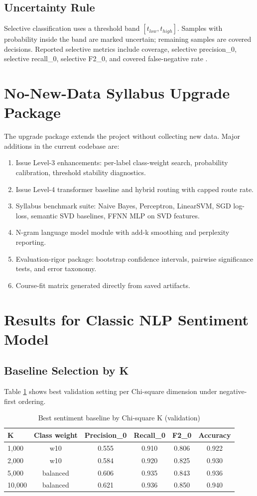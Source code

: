 \documentclass[12pt,a4paper]{article}
\begin{document}
\subsection{Uncertainty Rule}
Selective classification uses a threshold band \([t_{low}, t_{high}]\). Samples with probability inside the band are marked uncertain; remaining samples are covered decisions. Reported selective metrics include coverage, selective precision\_0, selective recall\_0, selective F2\_0, and covered false-negative rate \cite{geifman2017}.

\section{No-New-Data Syllabus Upgrade Package}
The upgrade package extends the project without collecting new data. Major additions in the current codebase are:
\begin{enumerate}
\item Issue Level-3 enhancements: per-label class-weight search, probability calibration, threshold stability diagnostics.
\item Issue Level-4 transformer baseline and hybrid routing with capped route rate.
\item Syllabus benchmark suite: Naive Bayes, Perceptron, LinearSVM, SGD log-loss, semantic SVD baselines, FFNN MLP on SVD features.
\item N-gram language model module with add-k smoothing and perplexity reporting.
\item Evaluation-rigor package: bootstrap confidence intervals, pairwise significance tests, and error taxonomy.
\item Course-fit matrix generated directly from saved artifacts.
\end{enumerate}

\section{Results for Classic NLP Sentiment Model}
\subsection{Baseline Selection by K}
Table \ref{tab:chi2_k} shows best validation setting per Chi-square dimension under negative-first ordering.

\begin{table}[H]
\centering
\caption{Best sentiment baseline by Chi-square K (validation)}
\label{tab:chi2_k}
\begin{tabular}{lccccc}
\toprule
K & Class weight & Precision\_0 & Recall\_0 & F2\_0 & Accuracy \\
\midrule
1,000 & w10 & 0.555 & 0.910 & 0.806 & 0.922 \\
2,000 & w10 & 0.584 & 0.920 & 0.825 & 0.930 \\
5,000 & balanced & 0.606 & 0.935 & 0.843 & 0.936 \\
10,000 & balanced & 0.621 & 0.936 & 0.850 & 0.940 \\
\bottomrule
\end{tabular}
\end{table}
\end{document}
